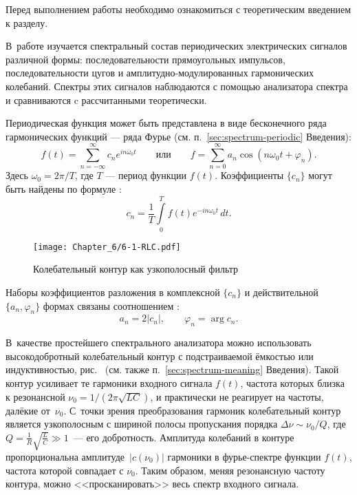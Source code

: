 

Перед выполнением работы необходимо ознакомиться с теоретическим введением
к разделу.

В~работе изучается спектральный состав периодических электрических сигналов
различной формы: последовательности прямоугольных импульсов, последовательности
цугов и амплитудно-модулированных гармонических колебаний. Спектры этих сигналов
наблюдаются с помощью анализатора спектра и сравниваются c рассчитанными
теоретически.

Периодическая функция может быть представлена в виде бесконечного ряда
гармонических функций --- ряда Фурье (см. п.~\ref{sec:spectrum-periodic}
Введения):
\begin{equation*}
f(t) = \sum_{n=-\infty}^{\infty} c_n e^{in\omega_0 t}\qquad\text{или}\qquad
f=\sum_{n=0}^{\infty} a_n \cos (n\omega_0 t + \varphi_n).
\end{equation*}
Здесь $\omega_0 = 2\pi/T$, где $T$ --- период функции $f(t)$.
Коэффициенты $\{c_n\}$ могут быть найдены по формуле
:
\begin{equation*}
    c_n=\frac{1}{T}\int\limits_{0}^{T} f(t)e^{-in\omega_0 t}\,dt.
\end{equation*}
\begin{wrapfigure}{o}{0.3\textwidth}
    \centering
    \texttt{[image: Chapter\_6/6-1-RLC.pdf]}
    \caption{Колебательный контур как узкополосный фильтр}
\end{wrapfigure}
Наборы коэффициентов разложения в комплексной $\{c_n\}$ и действительной
$\{a_n,\varphi_n\}$ формах связаны соотношением :
\begin{equation*}
a_n = 2|c_n|,\qquad \varphi_n = \arg c_n.
\end{equation*}

В~качестве простейшего спектрального анализатора можно использовать
высокодобротный колебательный контур с подстраиваемой ёмкостью или
индуктивностью, рис.~
(см. также п.~\ref{sec:spectrum-meaning} Введения).
Такой контур усиливает те гармоники входного сигнала $f(t)$,
частота которых близка к резонансной
$\nu_{0} = 1/(2\pi\sqrt{LC})$, и практически не реагирует на частоты,
далёкие от~$\nu_{0}$. С~точки зрения преобразования гармоник колебательный контур
является узкополосным  с шириной полосы
пропускания порядка $\Delta \nu \sim \nu_{0}/ Q$, где $Q =
\frac{1}{R}\sqrt{\frac{L}{C}} \gg 1$~--- его добротность. Амплитуда колебаний
в контуре пропорциональна амплитуде~$|c(\nu_0)|$ гармоники в фурье-спектре функции $f(t)$,
частота которой совпадает с $\nu_{0}$. 
Таким образом, меняя резонансную частоту контура,
можно <<просканировать>> весь спектр входного сигнала.

